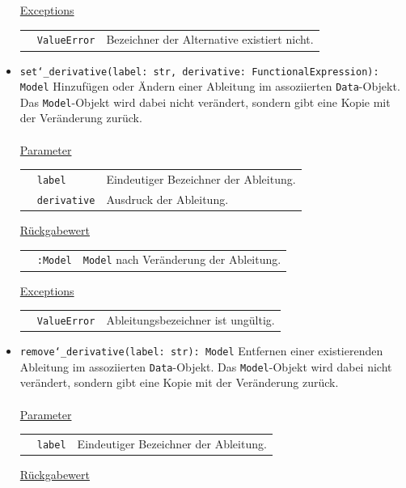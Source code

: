 \documentclass{article}
\begin{document}
\begin{itemize}
\underline{Exceptions}\\
\begin{tabular}{lll}
 & \texttt{ValueError} & Bezeichner der Alternative existiert nicht.\\
\end{tabular}


\item \texttt{set\char`_derivative(label: str, derivative: FunctionalExpression): Model} \newline Hinzufügen oder Ändern einer Ableitung im assoziierten \texttt{Data}-Objekt. Das \texttt{Model}-Objekt wird dabei nicht verändert, sondern gibt eine Kopie mit der Veränderung zurück.
\\\\
\underline{{Parameter}}

\begin{tabular}{lll}
 & \texttt{label} & Eindeutiger Bezeichner der Ableitung. \\
 & \texttt{derivative} & Ausdruck der Ableitung. \\
\end{tabular}

\underline{{Rückgabewert}}

\begin{tabular}{lll}
 & \texttt{:Model} & \texttt{Model} nach Veränderung der Ableitung. \\
\end{tabular}

\underline{Exceptions}\\
\begin{tabular}{lll}
 & \texttt{ValueError} & Ableitungsbezeichner ist ungültig.\\
\end{tabular}


\item \texttt{remove\char`_derivative(label: str): Model} \newline Entfernen einer existierenden Ableitung im assoziierten \texttt{Data}-Objekt. Das \texttt{Model}-Objekt wird dabei nicht verändert, sondern gibt eine Kopie mit der Veränderung zurück.
\\\\
\underline{{Parameter}}

\begin{tabular}{lll}
 & \texttt{label} & Eindeutiger Bezeichner der Ableitung. \\
\end{tabular}

\underline{{Rückgabewert}}


\end{itemize}
\end{document}
